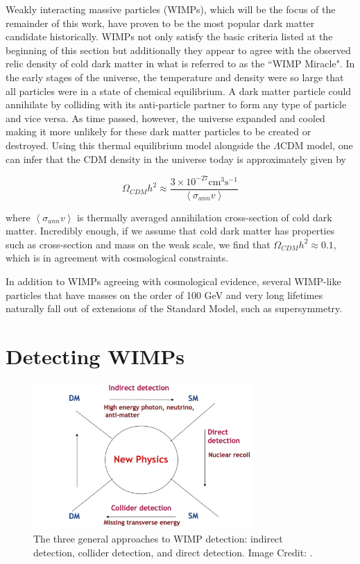 Weakly interacting massive particles (WIMPs), which will be the focus of the remainder of this work, have proven to be the most popular dark matter candidate historically.   WIMPs not only satisfy the basic criteria listed at the beginning of this section but additionally they appear to agree with the observed relic density of cold dark matter in what is referred to as the ``WIMP Miracle".  In the early stages of the universe, the temperature and density were so large that all particles were in a state of chemical equilibrium.  A dark matter particle could annihilate by colliding with its anti-particle partner to form any type of particle and vice versa.  As time passed, however, the universe expanded and cooled making it more unlikely for these dark matter particles to be created or destroyed.  Using this thermal equilibrium model alongside the $\Lambda$CDM model, one can infer that the CDM density in the universe today is approximately given by \cite{jungman1996supersymmetric, bertone2010particle}

\begin{equation}
        \Omega_{CDM}h^2 \approx \frac{3 \times 10^{-27} \mathrm{cm}^3  \mathrm{s}^{-1}}{\left< \sigma_{ann} v \right> }
\end{equation}

where $\left< \sigma_{ann} v \right>$ is thermally averaged annihilation cross-section of cold dark matter.  Incredibly enough, if we assume that cold dark matter has properties such as cross-section and mass on the weak scale, we find that $\Omega_{CDM}h^2 \approx 0.1$, which is in agreement with cosmological constraints. 

In addition to WIMPs agreeing with cosmological evidence, several WIMP-like particles that have masses on the order of 100 GeV and very long lifetimes naturally fall out of extensions of the Standard Model, such as supersymmetry.  



\section{Detecting WIMPs}

\begin{figure}[b]
	\centering
	\includegraphics[width=0.75\textwidth]{wimp_detection}
	\caption{The three general approaches to WIMP detection: indirect detection, collider detection, and direct detection.  Image Credit: \cite{bi2013status}.}
	\label{fig:wimp_detection}
\end{figure}

